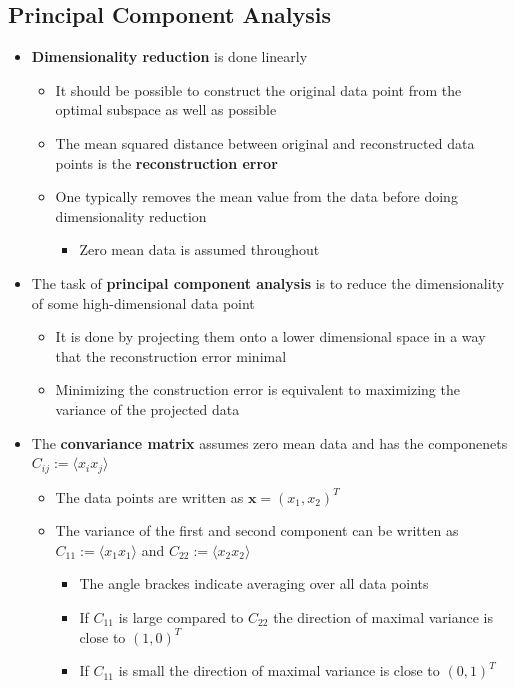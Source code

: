 \documentclass[a4, english]{article}
\begin{document}
\subsection{Principal Component Analysis}
\begin{itemize}
  \item \textbf{Dimensionality reduction} is done linearly
  \begin{itemize}
  	\item It should be possible to construct the original data point from the optimal subspace as well as possible  
	  \item The mean squared distance between original and reconstructed data points is the \textbf{reconstruction error}
    \item One typically removes the mean value from the data before doing dimensionality reduction
    \begin{itemize}
    	\item Zero mean data is assumed throughout
    \end{itemize}
  \end{itemize}
	\item The task of \textbf{principal component analysis} is to reduce the dimensionality of some high-dimensional data point
  \begin{itemize}
  	\item It is done by projecting them onto a lower dimensional space in a way that the reconstruction error minimal
    \item Minimizing the construction error is equivalent to maximizing the variance of the projected data
  \end{itemize}
  \item The \textbf{convariance matrix} assumes zero mean data and has the componenets $C_{ij} := \langle x_ix_j \rangle$  
  \begin{itemize}
  	\item The data points are written as $\pmb x = (x_1, x_2)^T$
    \item The variance of the first and second component can be written as $C_{11} := \langle x_1x_1 \rangle$ and $C_{22} := \langle x_2x_2 \rangle$
    \begin{itemize}
    	\item The angle brackes indicate averaging over all data points
      \item If $C_{11}$ is large compared to $C_{22}$ the direction of maximal variance is close to $(1,0)^T$
      \item If $C_{11}$ is small the direction of maximal variance is close to $(0,1)^T$

\end{itemize}
\end{itemize}
\end{itemize}
\end{document}

